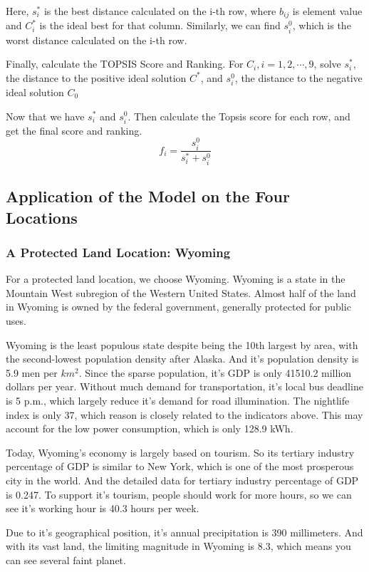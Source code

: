 Here, $s_i^*$ is the best distance calculated on the i-th row, where $b_{ij}$ is element value and $C_i^{*}$ is the ideal best for that column. Similarly, we can find $s_i^0$, which is the worst distance calculated on the i-th row.

Finally, calculate the TOPSIS Score and Ranking. For $C_i,i=1,2,\cdots,9$, solve $s_i^*$, the distance to the positive ideal solution $C^*$, and $s_i^0$, the distance to the negative ideal solution $C_0$

Now that we have $s_i^*$ and $s_i^0$. Then calculate the Topsis score for each row, and get the final score and ranking. $$f_i=\frac{s_i^0}{s_i^*+s_i^0}$$

\subsection{Application of the Model on the Four Locations}


\subsubsection{A Protected Land Location: Wyoming}
For a protected land location, we choose Wyoming. Wyoming is a state in the Mountain West subregion of the Western United States. Almost half of the land in Wyoming is owned by the federal government, generally protected for public uses.

Wyoming is the least populous state despite being the 10th largest by area, with the second-lowest population density after Alaska. And it's population density is 5.9 men per $km^2$. Since the sparse population, it's GDP is only 41510.2 million dollars per year. Without much demand for transportation, it's local bus deadline is 5 p.m., which largely reduce it's demand for road illumination. The nightlife index is only 37, which reason is closely related to the indicators above. This may account for the low power consumption, which is only 128.9 kWh. 

Today, Wyoming's economy is largely based on tourism. So its tertiary industry percentage of GDP is similar to New York, which is one of the most prosperous city in the world. And the detailed data for tertiary industry percentage of GDP is 0.247. To support it's tourism, people should work for more hours, so we can see it's working hour is 40.3 hours per week.

Due to it's geographical position, it's annual precipitation is 390 millimeters. And with its vast land, the limiting magnitude in Wyoming is 8.3, which means you can see several faint planet.

